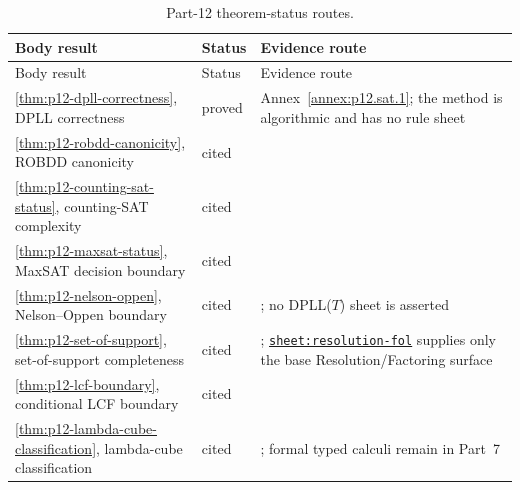\begin{longtable}{@{}p{}p{}p{}@{}}
\caption{Part-12 theorem-status routes.}
\label{tab:p12-status-routes}\\
\toprule
Body result & Status & Evidence route \\ \midrule
\endfirsthead
\toprule
Body result & Status & Evidence route \\ \midrule
\endhead
\ref{thm:p12-dpll-correctness}, DPLL correctness & proved &
Annex~\ref{annex:p12.sat.1}; the method is algorithmic and has no rule sheet \\
\addlinespace
\ref{thm:p12-robdd-canonicity}, ROBDD canonicity & cited &
\cite{Bryant1986} \\ \addlinespace
\ref{thm:p12-counting-sat-status}, counting-SAT complexity & cited &
\cite{Valiant1979Enumeration} \\ \addlinespace
\ref{thm:p12-maxsat-status}, MaxSAT decision boundary & cited &
\cite{LiManya2009} \\ \addlinespace
\ref{thm:p12-nelson-oppen}, Nelson--Oppen boundary & cited &
\cite{NelsonOppen1979}; no DPLL(\(T\)) sheet is asserted \\ \addlinespace
\ref{thm:p12-set-of-support}, set-of-support completeness & cited &
\cite{WosRobinsonCarson1965};
\hyperref[sheet:resolution-fol]{\texttt{sheet:resolution-fol}} supplies only
the base Resolution/Factoring surface \\ \addlinespace
\ref{thm:p12-lcf-boundary}, conditional LCF boundary & cited &
\cite{GordonMilnerWadsworth1979} \\ \addlinespace
\ref{thm:p12-lambda-cube-classification}, lambda-cube classification & cited &
\cite{Barendregt1992}; formal typed calculi remain in Part~7 \\
\bottomrule
\end{longtable}

